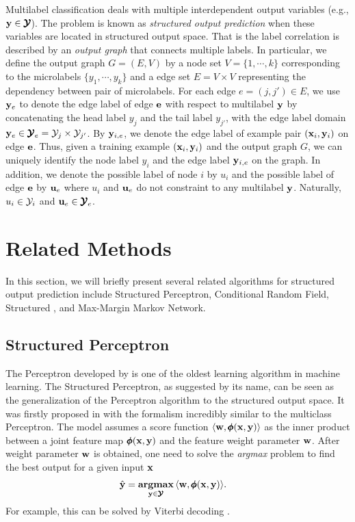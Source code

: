 {Multilabel classification deals with multiple interdependent output variables (e.g., $\mathbf {y}\in\pmb {\mathcal{Y}}$).
The problem is known as \textit{structured output prediction} when these variables are located in structured output space.
That is the label correlation is described by an \textit{output graph} that connects multiple labels.
In particular, we define the output graph $G=(E,V)$ by a node set $V=\{1,\cdots,k\}$ corresponding to the microlabels $\{y_1,\cdots,y_k\}$ and a edge set $E=V\times V$ representing the dependency between pair of microlabels.
For each edge $e=(j,j')\in E$, we use $\mathbf {y}_e$ to denote the edge label of edge $\mathbf {e}$ with respect to multilabel $\mathbf {y}$ by concatenating the head label $y_j$ and the tail label $y_{j'}$, with the edge label domain $\mathbf {y}_e\in\pmb {\mathcal{Y}}_e=\mathcal{Y}_j\times\mathcal{Y}_{j'}$.
By $\mathbf {y}_{i,e}$, we denote the edge label of example pair $(\mathbf {x}_i,\mathbf {y}_i)$ on edge $\mathbf {e}$.
Thus, given a training example $(\mathbf {x}_i,\mathbf {y}_i)$ and the output graph $G$, we can uniquely identify the node label $y_i$ and the edge label $\mathbf {y}_{i,e}$ on the graph.
In addition, we denote the possible label of node $i$ by $u_i$ and the possible label of edge $\mathbf {e}$ by $\mathbf {u}_{e}$ where $u_i$ and $\mathbf {u}_{e}$ do not constraint to any multilabel $\mathbf {y}$.
Naturally, $u_i\in\mathcal{Y}_i$ and $\mathbf {u}_e\in\pmb {\mathcal{Y}}_e$.



%
%
\section{Related Methods}

In this section, we will briefly present several related algorithms for structured output prediction include Structured Perceptron, Conditional Random Field, Structured \svm, and Max-Margin Markov Network.



%
%
\subsection{Structured Perceptron}

The Perceptron developed by \citet{Rosenblatt58} is one of the oldest learning algorithm in machine learning.
The Structured Perceptron, as suggested by its name, can be seen as the generalization of the Perceptron algorithm to the structured output space.
It was firstly proposed in \citep{collins02a, collins02b} with the formalism incredibly similar to the multiclass Perceptron. 
The model assumes a score function $\langle \mathbf {w}, \pmb \phi(\mathbf {x},\mathbf {y}) \rangle$ as the inner product between a joint feature map $\pmb \phi(\mathbf {x},\mathbf {y})$ and the feature weight parameter $\mathbf {w}$.
After weight parameter $\mathbf {w}$ is obtained, one need to solve the \textit{argmax} problem to find the best output for a given input $\mathbf {x}$
\begin{align}
	\hat{\mathbf {y}} = \underset{\mathbf {y}\in\pmb {\mathcal{Y}}}{\textbf{argmax}} &\, \langle \mathbf {w}, \pmb \phi(\mathbf {x},\mathbf {y}) \rangle.  \label{sp_inference}
\end{align}
For example, this can be solved by Viterbi decoding \citep{collins02a}.

}
